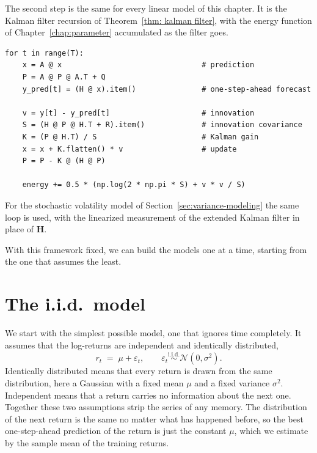 The second step is the same for every linear model of this chapter. It is the Kalman filter recursion of Theorem~\ref{thm: kalman filter}, with the energy function of Chapter~\ref{chap:parameter} accumulated as the filter goes.

\begin{verbatim}
for t in range(T):
    x = A @ x                                # prediction
    P = A @ P @ A.T + Q
    y_pred[t] = (H @ x).item()               # one-step-ahead forecast

    v = y[t] - y_pred[t]                     # innovation
    S = (H @ P @ H.T + R).item()             # innovation covariance
    K = (P @ H.T) / S                        # Kalman gain
    x = x + K.flatten() * v                  # update
    P = P - K @ (H @ P)

    energy += 0.5 * (np.log(2 * np.pi * S) + v * v / S)
\end{verbatim}

For the stochastic volatility model of Section~\ref{sec:variance-modeling} the same loop is used, with the linearized measurement of the extended Kalman filter in place of $\mathbf{H}$.

With this framework fixed, we can build the models one at a time, starting from the one that assumes the least.

\section{The i.i.d.\ model}\label{sec:iid}

We start with the simplest possible model, one that ignores time completely. It assumes that the log-returns are independent and identically distributed,
\begin{equation}\label{eq:iid}
  r_t \;=\; \mu + \varepsilon_t , \qquad
  \varepsilon_t \overset{\text{i.i.d.}}{\sim} \mathcal{N}(0, \sigma^2).
\end{equation}
Identically distributed means that every return is drawn from the same distribution, here a Gaussian with a fixed mean $\mu$ and a fixed variance $\sigma^2$. Independent means that a return carries no information about the next one. Together these two assumptions strip the series of any memory. The distribution of the next return is the same no matter what has happened before, so the best one-step-ahead prediction of the return is just the constant $\mu$, which we estimate by the sample mean of the training returns.

